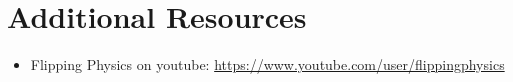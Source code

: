 \documentclass[11pt]{article}
\begin{document}
\section*{Additional Resources}
\begin{itemize}
    \item Flipping Physics on youtube: 
        \url{https://www.youtube.com/user/flippingphysics} 
\end{itemize}
\end{document}
